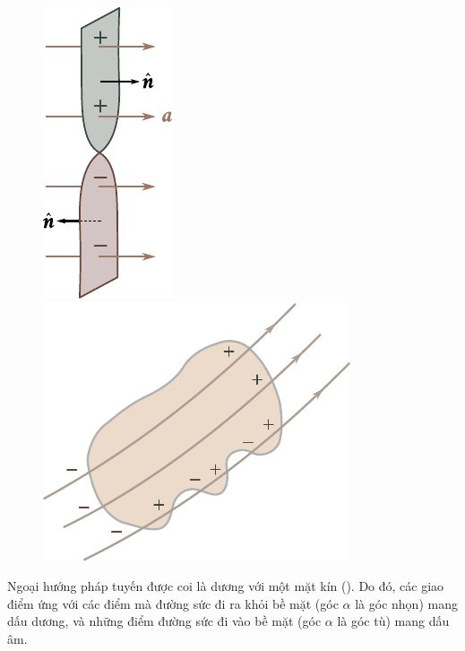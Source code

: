 \begin{figure}[!htb]
	\begin{minipage}[t]{0.4\linewidth}
		\begin{center}
			\includegraphics[scale=0.95]{figures/ch_01/fig_1_21.pdf}
			\caption[]{}
			\label{fig:1_21}
		\end{center}
	\end{minipage}
	\hspace{-0.05cm}
	\begin{minipage}[t]{0.6\linewidth}
		\begin{center}
			\includegraphics[scale=0.95]{figures/ch_01/fig_1_22.pdf}
			\caption[]{}
			\label{fig:1_22}
		\end{center}
	\end{minipage}
\vspace{-0.4cm}
\end{figure}

Ngoại hướng pháp tuyến được coi là dương với một mặt kín (). Do đó, các giao điểm ứng với các điểm mà đường sức đi ra khỏi bề mặt (góc $\alpha$ là góc nhọn) mang dấu dương, và những điểm đường sức đi vào bề mặt (góc $\alpha$ là góc tù) mang dấu âm.

